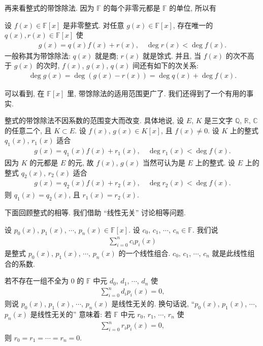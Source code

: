 再来看整式的带馀除法. 因为 $\mathbb{F}$ 的每个非零元都是 $\mathbb{F}$ 的单位, 所以有

\begin{proposition}
    设 $f(x) \in \mathbb{F}[x]$ 是非零整式. 对任意 $g(x) \in \mathbb{F}[x]$, 存在唯一的 $q(x), r(x) \in \mathbb{F}[x]$ 使
    \begin{align*}
        g(x) = q(x) f(x) + r(x), \quad \deg r(x) < \deg f(x).
    \end{align*}
    一般称其为带馀除法: $q(x)$ 就是商; $r(x)$ 就是馀式. 并且, 当 $f(x)$ 的次不高于 $g(x)$ 的次时, $f(x)$, $g(x)$, $q(x)$ 间还有如下的次关系:
    \begin{align*}
        \deg g(x) = \deg {(g(x) - r(x))} = \deg q(x) + \deg f(x).
    \end{align*}
\end{proposition}

可以看到, 在 $\mathbb{F}[x]$ 里, 带馀除法的适用范围更广了. 我们还得到了一个有用的事实.

\begin{proposition}
    整式的带馀除法不因系数的范围变大而改变. 具体地说, 设 $E$, $K$ 是三文字 $\mathbb{Q}$, $\mathbb{R}$, $\mathbb{C}$ 的任意二个, 且 $K \subset E$. 设 $f(x)$, $g(x) \in K[x]$, 且 $f(x) \neq 0$. 设 $K$ 上的整式 $q_1 (x)$, $r_1 (x)$ 适合
    \begin{align*}
        g(x) = q_1 (x) f(x) + r_1 (x), \quad \deg r_1 (x) < \deg f(x).
    \end{align*}
    因为 $K$ 的元都是 $E$ 的元, 故 $f(x)$, $g(x)$ 当然可认为是 $E$ 上的整式. 设 $E$ 上的整式 $q_2 (x)$, $r_2 (x)$ 适合
    \begin{align*}
        g(x) = q_2 (x) f(x) + r_2 (x), \quad \deg r_2 (x) < \deg f(x).
    \end{align*}
    则 $q_1 (x) = q_2 (x)$, 且 $r_1 (x) = r_2 (x)$.
\end{proposition}

下面回顾整式的相等. 我们借助 ``线性无关'' 讨论相等问题.

\begin{definition}
    设 $p_0 (x)$, $p_1 (x)$, $\cdots$, $p_n (x) \in \mathbb{F}[x]$. 设 $c_0$, $c_1$, $\cdots$, $c_n \in \mathbb{F}$. 我们说
    \begin{align*}
        \sum_{i = 0}^{n} c_i p_i (x)
    \end{align*}
    是整式 $p_0 (x)$, $p_1 (x)$, $\cdots$, $p_n (x)$ 的一个线性组合. $c_0$, $c_1$, $\cdots$, $c_n$ 就是此线性组合的系数.

    若不存在一组不全为 $0$ 的 $\mathbb{F}$ 中元 $d_0$, $d_1$, $\cdots$, $d_n$ 使
    \begin{align*}
        \sum_{i = 0}^{n} d_i p_i (x) = 0,
    \end{align*}
    则说 $p_0 (x)$, $p_1 (x)$, $\cdots$, $p_n (x)$ 是线性无关的. 换句话说, ``$p_0 (x)$, $p_1 (x)$, $\cdots$, $p_n (x)$ 是线性无关的'' 意味着: 若 $\mathbb{F}$ 中元 $r_0$, $r_1$, $\cdots$, $r_n$ 使
    \begin{align*}
        \sum_{i = 0}^{n} r_i p_i (x) = 0,
    \end{align*}
    则 $r_0 = r_1 = \cdots = r_n = 0$.
\end{definition}

